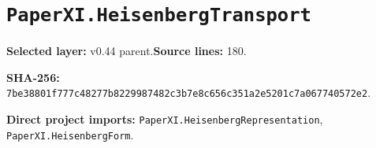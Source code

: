 \documentclass[10pt,oneside]{book}
\begin{document}
\section{\texorpdfstring{\nolinkurl{PaperXI.HeisenbergTransport}}{PaperXI.HeisenbergTransport}}\label{module:PaperXI.HeisenbergTransport}

\textbf{Selected layer:} v0.44 parent.\quad\textbf{Source lines:} 180.\par\textbf{SHA-256:} {\scriptsize\nolinkurl{7be38801f777c48277b8229987482c3b7e8c656c351a2e5201c7a067740572e2}}.


\textbf{Direct project imports:} \nolinkurl{PaperXI.HeisenbergRepresentation}, \nolinkurl{PaperXI.HeisenbergForm}.
\end{document}
